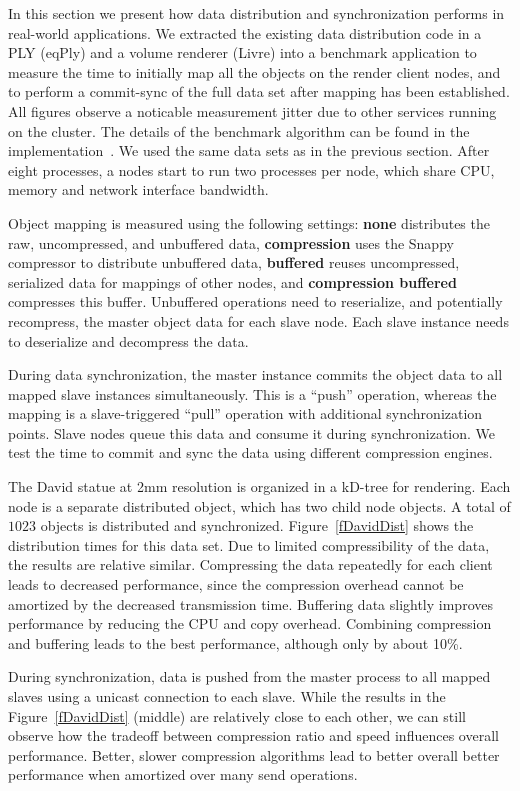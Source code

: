 \documentclass[10pt,journal,compsoc]{IEEEtran}
\newcommand{\fig}[1]{Figure~\ref{#1}}
\begin{document}
In this section we present how data distribution and synchronization performs in
real-world applications. We extracted the existing data distribution code in a
PLY (eqPly) and a volume renderer (Livre) into a benchmark application to
measure the time to initially map all the objects on the render client nodes,
and to perform a commit-sync of the full data set after mapping has been
established. All figures observe a noticable measurement jitter due to other
services running on the cluster. The details of the benchmark algorithm can be
found in the implementation~\cite{eqObjectBench}. We used the same data sets as
in the previous section. After eight processes, a nodes start to run two
processes per node, which share CPU, memory and network interface bandwidth.

Object mapping is measured using the following settings: \textbf{none}
distributes the raw, uncompressed, and unbuffered data, \textbf{compression}
uses the Snappy compressor to distribute unbuffered data, \textbf{buffered}
reuses uncompressed, serialized data for mappings of other nodes, and
\textbf{compression buffered} compresses this buffer. Unbuffered operations need
to reserialize, and potentially recompress, the master object data for each
slave node. Each slave instance needs to deserialize and decompress the data.

During data synchronization, the master instance commits the object data to all
mapped slave instances simultaneously. This is a ``push'' operation, whereas the
mapping is a slave-triggered ``pull'' operation with additional synchronization
points. Slave nodes queue this data and consume it during synchronization. We
test the time to commit and sync the data using different compression engines.


The David statue at 2mm resolution is organized in a kD-tree for rendering. Each
node is a separate distributed object, which has two child node objects. A
total of $1023$ objects is distributed and synchronized. \fig{fDavidDist} shows
the distribution times for this data set. Due to limited compressibility of the
data, the results are relative similar. Compressing the data repeatedly for
each client leads to decreased performance, since the compression overhead
cannot be amortized by the decreased transmission time. Buffering data slightly
improves performance by reducing the CPU and copy overhead. Combining
compression and buffering leads to the best performance, although only by about
10\%.

During synchronization, data is pushed from the master process to all mapped
slaves using a unicast connection to each slave. While the results in the
\fig{fDavidDist} (middle) are relatively close to each other, we can still
observe how the tradeoff between compression ratio and speed influences overall
performance. Better, slower compression algorithms lead to better overall better
performance when amortized over many send operations.
\end{document}
